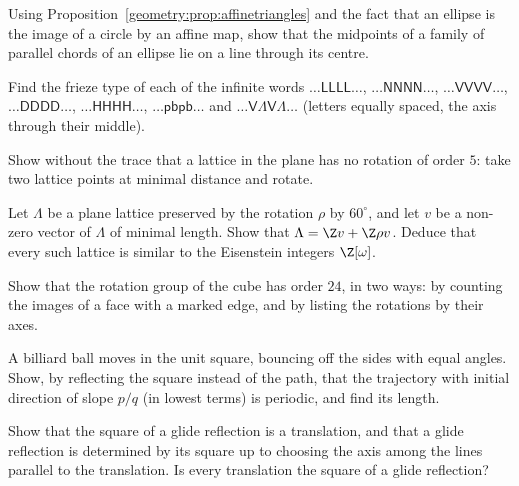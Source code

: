 \begin{exercise}[$\star$]\label{geometry:ex:affineellipse}
Using Proposition~\ref{geometry:prop:affinetriangles} and the fact that an ellipse is the image of a circle by an affine map, show that the midpoints
of a family of parallel chords of an ellipse lie on a line through its centre.
\end{exercise}

\begin{exercise}[$\star$]\label{geometry:ex:friezeid}
Find the frieze type of each of the infinite words
$\dots\mathsf{LLLL}\dots$, $\dots\mathsf{NNNN}\dots$, $\dots\mathsf{VVVV}\dots$, $\dots\mathsf{DDDD}\dots$, $\dots\mathsf{HHHH}\dots$,
$\dots\mathsf{pbpb}\dots$ and $\dots\mathsf{V\Lambda V\Lambda}\dots$ (letters equally spaced, the axis through their middle).
\end{exercise}

\begin{exercise}[$\star$]\label{geometry:ex:fivefold}
Show without the trace that a lattice in the plane has no rotation of order $5$: take two lattice points at minimal distance and
rotate.
\end{exercise}

\begin{exercise}[$\star\star$]\label{geometry:ex:hexagonal}
Let $\Lambda$ be a plane lattice preserved by the rotation $\rho$ by $60^\circ$, and let $v$ be a non-zero vector of $\Lambda$ of minimal
length. Show that $\Lambda=\Z v+\Z\rho v$. Deduce that every such lattice is similar to the Eisenstein integers $\Z[\omega]$.
\end{exercise}

\begin{exercise}[$\star\star$]\label{geometry:ex:cube}
Show that the rotation group of the cube has order $24$, in two ways: by counting the images of a face with a marked edge, and by listing the
rotations by their axes.
\end{exercise}

\begin{exercise}[$\star\star$]\label{geometry:ex:billiards}
A billiard ball moves in the unit square, bouncing off the sides with equal angles. Show, by reflecting the square instead of the path,
that the trajectory with initial direction of slope $p/q$ (in lowest terms) is periodic, and find its length.
\end{exercise}

\begin{exercise}[$\star$]\label{geometry:ex:glidesquare}
Show that the square of a glide reflection is a translation, and that a glide reflection is determined by its square up to choosing the
axis among the lines parallel to the translation. Is every translation the square of a glide reflection?
\end{exercise}

